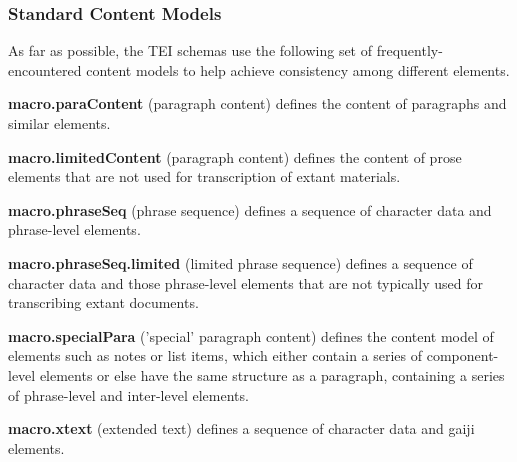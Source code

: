 \subsubsection[{Standard Content Models}]{Standard Content Models}\label{STECST}\par
As far as possible, the TEI schemas use the following set of frequently-encountered content models to help achieve consistency among different elements. 
\begin{sansreflist}
  
\item [\textbf{macro.paraContent}] (paragraph content) defines the content of paragraphs and similar elements.
\item [\textbf{macro.limitedContent}] (paragraph content) defines the content of prose elements that are not used for transcription of extant materials.
\item [\textbf{macro.phraseSeq}] (phrase sequence) defines a sequence of character data and phrase-level elements.
\item [\textbf{macro.phraseSeq.limited}] (limited phrase sequence) defines a sequence of character data and those phrase-level elements that are not typically used for transcribing extant documents.
\item [\textbf{macro.specialPara}] ('special' paragraph content) defines the content model of elements such as notes or list items, which either contain a series of component-level elements or else have the same structure as a paragraph, containing a series of phrase-level and inter-level elements.
\item [\textbf{macro.xtext}] (extended text) defines a sequence of character data and gaiji elements.
\end{sansreflist}
\par
